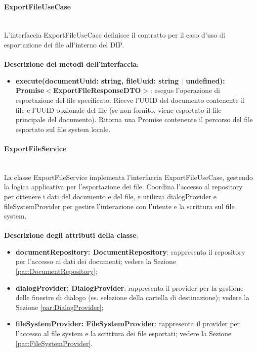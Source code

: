\documentclass[a4paper,12pt]{article}
\begin{document}
{{                \paragraph{ExportFileUseCase}\label{par:ExportFileUseCase}\mbox{}\\
                L'interfaccia ExportFileUseCase definisce il contratto per il caso d'uso di esportazione dei file all'interno del DIP.\\
                \\
              \noindent \textbf{Descrizione dei metodi dell'interfaccia}:
                \begin{itemize}
                    \item \textbf{execute(documentUuid: string, fileUuid: string $|$ undefined):\\ Promise$<$ExportFileResponseDTO$>$}: esegue l'operazione di esportazione del file specificato. Riceve l'UUID del documento contenente il file e l'UUID opzionale del file (se non fornito, viene esportato il file principale del documento). Ritorna una Promise contenente il percorso del file esportato sul file system locale.
                \end{itemize}

                \paragraph{ExportFileService}\label{par:ExportFileService}\mbox{}\\
                La classe ExportFileService implementa l'interfaccia ExportFileUseCase, gestendo la logica applicativa per l'esportazione dei file. Coordina l'accesso al repository per ottenere i dati del documento e del file, e utilizza dialogProvider e fileSystemProvider per gestire l'interazione con l'utente e la scrittura sul file system.\\
                \\
                \textbf{Descrizione degli attributi della classe}:
                \begin{itemize}
                    \item \textbf{documentRepository: DocumentRepository}: rappresenta il repository per l'accesso ai dati dei documenti; vedere la Sezione \ref{par:DocumentRepository};
                    \item \textbf{dialogProvider: DialogProvider}: rappresenta il provider per la gestione delle finestre di dialogo (es. selezione della cartella di destinazione); vedere la Sezione \ref{par:DialogProvider};
                    \item \textbf{fileSystemProvider: FileSystemProvider}: rappresenta il provider per l'accesso al file system e la scrittura dei file esportati; vedere la Sezione \ref{par:FileSystemProvider}.
                \end{itemize}
                
}}
\end{document}
